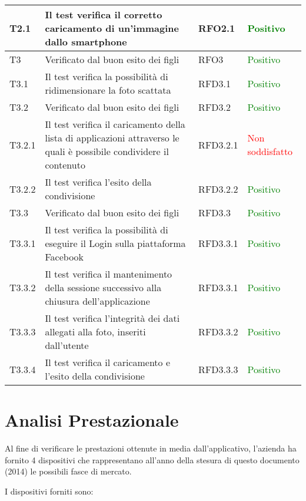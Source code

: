 \begin{center}
\begin{longtable}{ | p{2cm} | p{6cm} | p{2cm} | p{2cm} |}
    T2.1&Il test verifica il corretto caricamento di un'immagine dallo smartphone &RFO2.1  & \textcolor{green}{Positivo}\\ \hline 
    T3& Verificato dal buon esito dei figli &RFO3 & \textcolor{green}{Positivo}\\ \hline 
    T3.1& Il test verifica la possibilità di ridimensionare la foto scattata &RFD3.1 & \textcolor{green}{Positivo}\\ \hline 
    T3.2& Verificato dal buon esito dei figli &RFD3.2  & \textcolor{green}{Positivo}\\ \hline 
    T3.2.1&Il test verifica il caricamento della lista di applicazioni attraverso le quali
è possibile condividere il contenuto &RFD3.2.1  & \textcolor{red}{Non soddisfatto}\\ \hline 
    T3.2.2&Il test verifica l'esito della condivisione&RFD3.2.2  & \textcolor{green}{Positivo}\\ \hline 
    T3.3& Verificato dal buon esito dei figli &RFD3.3  & \textcolor{green}{Positivo}\\ \hline 
    T3.3.1& Il test verifica la possibilità di eseguire il Login sulla piattaforma Facebook &RFD3.3.1  & \textcolor{green}{Positivo}\\ \hline 
    T3.3.2&Il test verifica il mantenimento della sessione successivo alla chiusura
dell'applicazione &RFD3.3.1  & \textcolor{green}{Positivo}\\ \hline 
    T3.3.3& Il test verifica l'integrità dei dati allegati alla foto, inseriti dall'utente &RFD3.3.2  & \textcolor{green}{Positivo}\\ \hline 
    T3.3.4& Il test verifica il caricamento e l'esito della condivisione&RFD3.3.3  & \textcolor{green}{Positivo}\\ \hline 
    \end{longtable}
\end{center}


\section{Analisi Prestazionale}

Al fine di verificare le prestazioni ottenute in media dall'applicativo, l'azienda ha fornito 4 dispositivi che rappresentano all'anno della stesura di questo documento (2014) le possibili fasce di mercato.

I dispositivi forniti sono:

